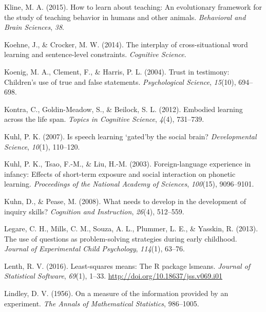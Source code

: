 \documentclass[oneside]{report}
\begin{document}
\leavevmode\hypertarget{ref-kline2015learn}{}%
Kline, M. A. (2015). How to learn about teaching: An evolutionary
framework for the study of teaching behavior in humans and other
animals. \emph{Behavioral and Brain Sciences}, \emph{38}.

\leavevmode\hypertarget{ref-koehne2014interplay}{}%
Koehne, J., \& Crocker, M. W. (2014). The interplay of cross-situational
word learning and sentence-level constraints. \emph{Cognitive Science}.

\leavevmode\hypertarget{ref-koenig2004trust}{}%
Koenig, M. A., Clement, F., \& Harris, P. L. (2004). Trust in testimony:
Children's use of true and false statements. \emph{Psychological
Science}, \emph{15}(10), 694--698.

\leavevmode\hypertarget{ref-kontra2012embodied}{}%
Kontra, C., Goldin-Meadow, S., \& Beilock, S. L. (2012). Embodied
learning across the life span. \emph{Topics in Cognitive Science},
\emph{4}(4), 731--739.

\leavevmode\hypertarget{ref-kuhl2007speech}{}%
Kuhl, P. K. (2007). Is speech learning `gated'by the social brain?
\emph{Developmental Science}, \emph{10}(1), 110--120.

\leavevmode\hypertarget{ref-kuhl2003foreign}{}%
Kuhl, P. K., Tsao, F.-M., \& Liu, H.-M. (2003). Foreign-language
experience in infancy: Effects of short-term exposure and social
interaction on phonetic learning. \emph{Proceedings of the National
Academy of Sciences}, \emph{100}(15), 9096--9101.

\leavevmode\hypertarget{ref-kuhn2008needs}{}%
Kuhn, D., \& Pease, M. (2008). What needs to develop in the development
of inquiry skills? \emph{Cognition and Instruction}, \emph{26}(4),
512--559.

\leavevmode\hypertarget{ref-legare2013use}{}%
Legare, C. H., Mills, C. M., Souza, A. L., Plummer, L. E., \& Yasskin,
R. (2013). The use of questions as problem-solving strategies during
early childhood. \emph{Journal of Experimental Child Psychology},
\emph{114}(1), 63--76.

\leavevmode\hypertarget{ref-lenth2016lsmeans}{}%
Lenth, R. V. (2016). Least-squares means: The R package lsmeans.
\emph{Journal of Statistical Software}, \emph{69}(1), 1--33.
\url{http://doi.org/10.18637/jss.v069.i01}

\leavevmode\hypertarget{ref-lindley1956measure}{}%
Lindley, D. V. (1956). On a measure of the information provided by an
experiment. \emph{The Annals of Mathematical Statistics}, 986--1005.
\end{document}
